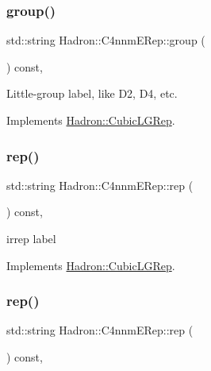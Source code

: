 \subsubsection{\texorpdfstring{group()}{group()}\hspace{0.1cm}{\footnotesize\ttfamily [2/2]}}
{\footnotesize\ttfamily std\+::string Hadron\+::\+C4nnm\+E\+Rep\+::group (\begin{DoxyParamCaption}{ }\end{DoxyParamCaption}) const\hspace{0.3cm}{\ttfamily [inline]}, {\ttfamily [virtual]}}

Little-\/group label, like D2, D4, etc. 

Implements \mbox{\hyperlink{structHadron_1_1CubicLGRep_a9bdb14b519a611d21379ed96a3a9eb41}{Hadron\+::\+Cubic\+L\+G\+Rep}}.

\mbox{\label{structHadron_1_1C4nnmERep_af7b1046412f5b815c19810b47eb8686d}} 
\subsubsection{\texorpdfstring{rep()}{rep()}\hspace{0.1cm}{\footnotesize\ttfamily [1/2]}}
{\footnotesize\ttfamily std\+::string Hadron\+::\+C4nnm\+E\+Rep\+::rep (\begin{DoxyParamCaption}{ }\end{DoxyParamCaption}) const\hspace{0.3cm}{\ttfamily [inline]}, {\ttfamily [virtual]}}

irrep label 

Implements \mbox{\hyperlink{structHadron_1_1CubicLGRep_a50f5ddbb8f4be4cee0106fa9e8c75e6c}{Hadron\+::\+Cubic\+L\+G\+Rep}}.

\mbox{\label{structHadron_1_1C4nnmERep_af7b1046412f5b815c19810b47eb8686d}} 
\subsubsection{\texorpdfstring{rep()}{rep()}\hspace{0.1cm}{\footnotesize\ttfamily [2/2]}}
{\footnotesize\ttfamily std\+::string Hadron\+::\+C4nnm\+E\+Rep\+::rep (\begin{DoxyParamCaption}{ }\end{DoxyParamCaption}) const\hspace{0.3cm}{\ttfamily [inline]}, {\ttfamily [virtual]}}

